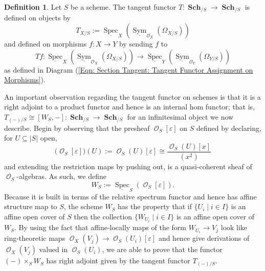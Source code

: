 \documentclass{amsart}
\theoremstyle{definition}
\newtheorem{definition}[equation]{Definition}
\DeclareMathOperator{\Ocal}{\mathcal{O}}
\DeclareMathOperator{\sym}{Sym}
\DeclareMathOperator{\Spec}{Spec}
\newcommand{\RelSpec}[1]{\underline{\Spec}_{#1}}
\newcommand{\RelSym}[1]{\underline{\sym}_{{#1}}}
\let\epsilon\varepsilon
\DeclareMathOperator{\Sch}{\mathbf{Sch}}
\let\epsilon\varepsilon
\newcommand{\Kah}[2]{\Omega_{{#1}/{#2}}}
\numberwithin{equation}{subsection}
\begin{document}
\begin{definition}\label{Defn: Section Tangent: Tangent functor for schemes}
Let $S$ be a scheme. The tangent functor $T:\Sch_{/S} \to \Sch_{/S}$ is defined on objects by
\[
T_{X/S} := \RelSpec{X}\left(\RelSym{\Ocal_X}\left(\Kah{X}{S}\right)\right)
\]
and defined on morphisms $f:X \to Y$ by sending $f$ to
\[
Tf:\RelSpec{X}\left(\RelSym{\Ocal_X}\left(\Kah{X}{S}\right)\right) \longrightarrow \RelSpec{Y}\left(\RelSym{\Ocal_Y}\left(\Kah{Y}{S}\right)\right)
\]
as defined in Diagram (\ref{Eqn: Section Tangent: Tangent Functor Assignment on Morphisms}).
\end{definition}

An important observation regarding the tangent functor on schemes is that it is a right adjoint to a product functor and hence is an internal hom functor; that is, $T_{(-)/S} \cong [W_S,-]:\Sch_{/S} \to \Sch_{/S}$ for an infinitesimal object we now describe. Begin by observing that the presheaf $\Ocal_{S}[\epsilon]$ on $S$ defined by declaring, for $U \subseteq \lvert S \rvert$ open,
\[
\big(\Ocal_S[\epsilon]\big)(U) := \Ocal_S(U)[\epsilon] \cong \frac{\Ocal_S(U)[x]}{(x^2)}
\]
and extending the restriction maps by pushing out, is a quasi-coherent sheaf of $\Ocal_S$-algebras. As such, we define 
\[
W_S := \RelSpec{S}(\Ocal_S[\epsilon]).
\]
Because it is built in terms of the relative spectrum functor and hence has affine structure map to $S$, the scheme $W_S$ has the property that if $\lbrace U_i \; | \; i \in I \rbrace$ is an affine open cover of $S$ then the collection $\lbrace W_{U_i} \; | \; i \in I \rbrace$ is an affine open cover of $W_S$. By using the fact that affine-locally maps of the form $W_{U_i} \to V_j$ look like ring-theoretic maps $\Ocal_X(V_j) \to \Ocal_S(U_i)[\epsilon]$ and hence give derivations of $\Ocal_X(V_j)$ valued in $\Ocal_S(U_i)$, we are able to prove that the functor $(-) \times_S W_S$ has right adjoint given by the tangent functor $T_{(-)/S}$.
\end{document}
